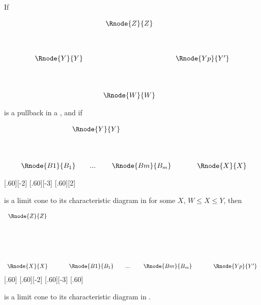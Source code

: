 \documentclass[10pt,a4paper]{scrartcl}
\begin{document}
\begin{lemma}
If 

\begin{center}
\begin{equation}
\label{pbdrilldownpullback}
\begin{array}{cp{0.3cm}c    p{0.3cm}  c }
               & & \Rnode{Z}{Z} & &                                  \\ [1.3cm]
\Rnode{Y}{Y}   &&                               & & \Rnode{Yp}{Y'}   \\ [1.4cm]
               & & \Rnode{W}{W} & &   
\end{array}
\end{equation}
\end{center}

is a pullback in a \ccatc,
and if 
\begin{center}
\begin{displaymath}
\begin{array}{c p{0.4cm} c  }
\Rnode{Y}{Y} &&   \\ [1.4cm]
\begin{array}{cp{0cm}c   p{0.1cm}     c  }					
                             \Rnode{B1}{B_1}&   & ... & & \Rnode{Bm}{B_m}
	                      \end{array} 
	 && \Rnode{X}{X}                                              
\end{array} 
\end{displaymath}

[.60][-2]
[.60][-3]
[.60][2]
\end{center}
is a limit cone to its characteristic diagram in \ccat  for some $X$, $W \leq X \leq Y$, then  
\begin{center}
\begin{equation}
\label{pbdrilldowncone}
\begin{array}{c p{0.4cm} c p{0.4cm} c }
\Rnode{Z}{Z} && &&      \\ [2.6cm]
\Rnode{X}{X}&& \begin{array}{cp{0cm}c   p{0.1cm}     c  }					
                             \Rnode{B1}{B_1}&   & ... & & \Rnode{Bm}{B_m}
	                      \end{array} 
	 && \Rnode{Yp}{Y'}                                              
\end{array} 
\end{equation}
[.60]
[.60][-2]
[.60][-3]
[.60]
\end{center}
is a limit cone to its characteristic diagram in \ccat.
\end{lemma}
\end{document}
